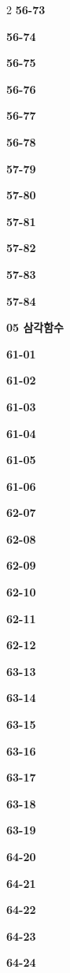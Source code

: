 \documentclass[10pt,a4paper]{article}
\begin{document}
\begin{multicols}{2}
\noindent\textbf{56-73}\ \par
\noindent\textbf{56-74}\ \par
\noindent\textbf{56-75}\ \par
\noindent\textbf{56-76}\ \par
\noindent\textbf{56-77}\ \par
\noindent\textbf{56-78}\ \par
\noindent\textbf{57-79}\ \par
\noindent\textbf{57-80}\ \par
\noindent\textbf{57-81}\ \par
\noindent\textbf{57-82}\ \par
\noindent\textbf{57-83}\ \par
\noindent\textbf{57-84}\ \par
\noindent\textbf{05 삼각함수}\par\smallskip
\noindent\textbf{61-01}\ \par
\noindent\textbf{61-02}\ \par
\noindent\textbf{61-03}\ \par
\noindent\textbf{61-04}\ \par
\noindent\textbf{61-05}\ \par
\noindent\textbf{61-06}\ \par
\noindent\textbf{62-07}\ \par
\noindent\textbf{62-08}\ \par
\noindent\textbf{62-09}\ \par
\noindent\textbf{62-10}\ \par
\noindent\textbf{62-11}\ \par
\noindent\textbf{62-12}\ \par
\noindent\textbf{63-13}\ \par
\noindent\textbf{63-14}\ \par
\noindent\textbf{63-15}\ \par
\noindent\textbf{63-16}\ \par
\noindent\textbf{63-17}\ \par
\noindent\textbf{63-18}\ \par
\noindent\textbf{63-19}\ \par
\noindent\textbf{64-20}\ \par
\noindent\textbf{64-21}\ \par
\noindent\textbf{64-22}\ \par
\noindent\textbf{64-23}\ \par
\noindent\textbf{64-24}\ \par

\end{multicols}
\end{document}
